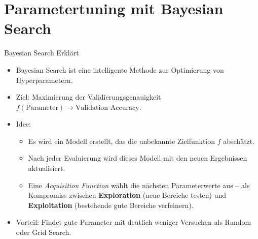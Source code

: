 \section{Parametertuning mit Bayesian Search}

\begin{frame}{Bayesian Search Erklärt}
\begin{itemize}
    \item Bayesian Search ist eine intelligente Methode zur Optimierung von Hyperparametern.
    \item Ziel: Maximierung der Validierungsgenauigkeit $f(\text{Parameter}) \rightarrow \text{Validation Accuracy}$.
    \item Idee:
        \begin{itemize}
            \item Es wird ein Modell erstellt, das die unbekannte Zielfunktion $f$ abschätzt.
            \item Nach jeder Evaluierung wird dieses Modell mit den neuen Ergebnissen aktualisiert.
            \item Eine \textit{Acquisition Function} wählt die nächsten Parameterwerte aus – als Kompromiss zwischen \textbf{Exploration} (neue Bereiche testen) und \textbf{Exploitation} (bestehende gute Bereiche verfeinern).
        \end{itemize}
    \item Vorteil: Findet gute Parameter mit deutlich weniger Versuchen als Random oder Grid Search.
\end{itemize}
\end{frame}

